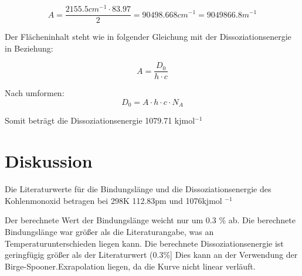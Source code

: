 \documentclass[12pt]{article}
\begin{document}
\begin{equation}
    A = \frac{2155.5cm^{-1} \cdot 83.97}{2} = 90498.668cm^{-1} = 9049866.8 m^{-1}
\end{equation}

Der Flächeninhalt steht wie in folgender Gleichung mit der Dissoziationsenergie in Beziehung:

\begin{equation}
    A = \frac{D_0}{h\cdot c}
\end{equation}

Nach umformen:
\begin{equation}
    D_0 = A \cdot h \cdot c \cdot N_A
\end{equation}

Somit beträgt die Dissoziationsenergie 1079.71 kjmol$^{-1}$

\section{Diskussion}

Die Literaturwerte für die Bindungslänge und die Dissoziationsenergie des Kohlenmonoxid betragen bei 298K 112.83pm \supercite{atkins} und 1076kjmol $^{-1}$ ~\supercite{atkins}

Der berechnete Wert der Bindungslänge weicht nur um 0.3 \% ab. Die berechnete Bindungslänge war größer als die Literaturangabe, was an Temperaturunterschieden liegen kann. Die berechnete Dissoziationsenergie ist geringfügig größer als der Literaturwert (0.3\%]  Dies kann an der Verwendung der Birge-Spooner.Exrapolation liegen, da die Kurve nicht linear verläuft.

\printbibliography
\end{document}
